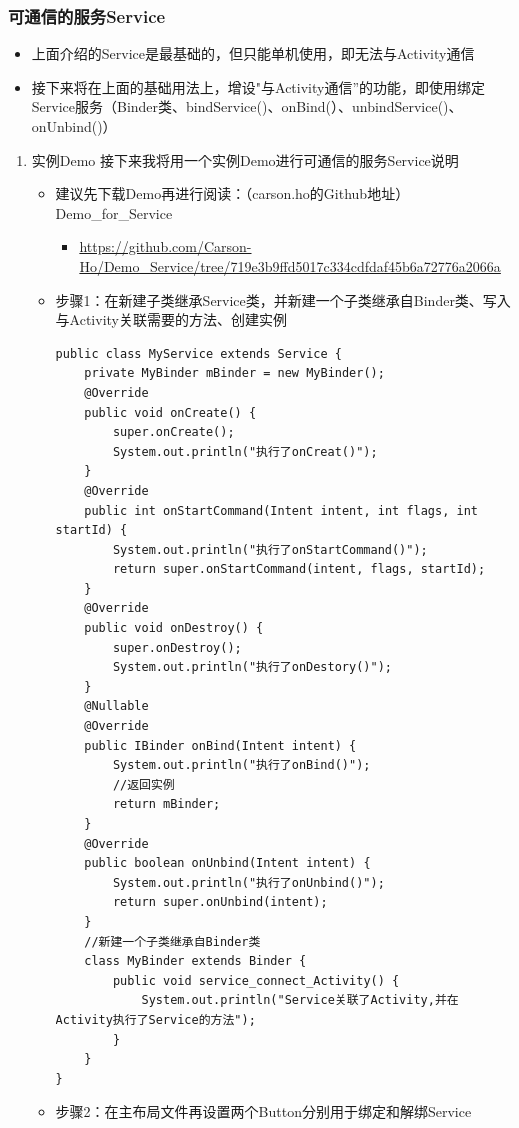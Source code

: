 \documentclass[9pt, b5paper]{article}
\begin{document}
\subsubsection{可通信的服务Service}
\label{sec-3-4-2}
\begin{itemize}
\item 上面介绍的Service是最基础的，但只能单机使用，即无法与Activity通信
\item 接下来将在上面的基础用法上，增设"与Activity通信”的功能，即使用绑定Service服务（Binder类、bindService()、onBind(）、unbindService()、onUnbind()）
\end{itemize}
\begin{enumerate}
\item 实例Demo
\label{sec-3-4-2-1}
接下来我将用一个实例Demo进行可通信的服务Service说明
\begin{itemize}
\item 建议先下载Demo再进行阅读：（carson.ho的Github地址）Demo\_for\_Service
\begin{itemize}
\item \url{https://github.com/Carson-Ho/Demo_Service/tree/719e3b9ffd5017c334cdfdaf45b6a72776a2066a}
\end{itemize}
\item 步骤1：在新建子类继承Service类，并新建一个子类继承自Binder类、写入与Activity关联需要的方法、创建实例
\begin{verbatim}
public class MyService extends Service {
    private MyBinder mBinder = new MyBinder();
    @Override
    public void onCreate() {
        super.onCreate();
        System.out.println("执行了onCreat()");
    }
    @Override
    public int onStartCommand(Intent intent, int flags, int startId) {
        System.out.println("执行了onStartCommand()");
        return super.onStartCommand(intent, flags, startId);
    }
    @Override
    public void onDestroy() {
        super.onDestroy();
        System.out.println("执行了onDestory()");
    }
    @Nullable
    @Override
    public IBinder onBind(Intent intent) {
        System.out.println("执行了onBind()");
        //返回实例
        return mBinder;
    }
    @Override
    public boolean onUnbind(Intent intent) {
        System.out.println("执行了onUnbind()");
        return super.onUnbind(intent);
    }
    //新建一个子类继承自Binder类
    class MyBinder extends Binder {
        public void service_connect_Activity() {
            System.out.println("Service关联了Activity,并在Activity执行了Service的方法");
        }
    }
}
\end{verbatim}
\item 步骤2：在主布局文件再设置两个Button分别用于绑定和解绑Service

\end{itemize}
\end{enumerate}
\end{document}
